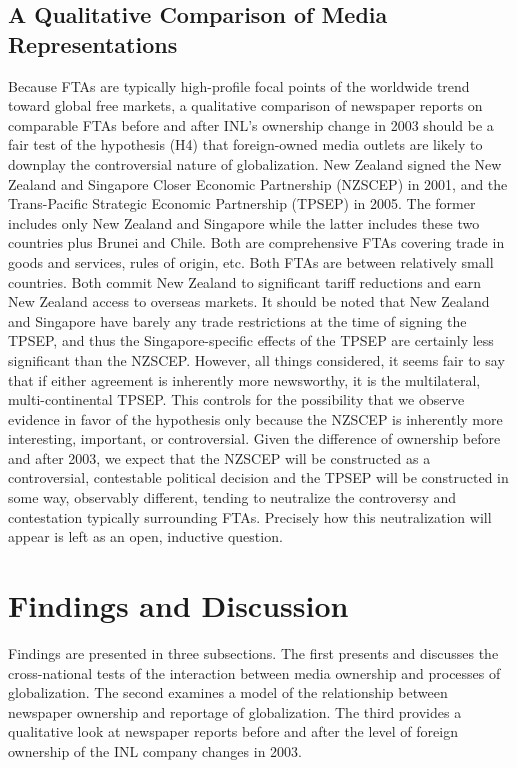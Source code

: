 \documentclass[12pt]{report}
\begin{document}
\subsection{A Qualitative Comparison of Media Representations}
Because FTAs are typically high-profile focal points of the worldwide trend toward global free markets, a qualitative comparison of newspaper reports on comparable FTAs before and after INL's ownership change in 2003 should be a
fair test of the hypothesis (H4) that foreign-owned media outlets are likely to downplay the
controversial nature of globalization. New Zealand signed the New Zealand and Singapore Closer
Economic Partnership (NZSCEP) in 2001, and the Trans-Pacific Strategic Economic Partnership (TPSEP)
in 2005. The former includes only New Zealand and Singapore while the latter includes these two
countries plus Brunei and Chile. Both are comprehensive FTAs covering trade in goods and services,
rules of origin, etc. Both FTAs are between relatively small countries. Both commit New Zealand to
significant tariff reductions and earn New Zealand access to overseas markets. It should be noted
that New Zealand and Singapore have barely any trade restrictions at the time of signing the TPSEP,
and thus the Singapore-specific effects of the TPSEP are certainly less significant than the NZSCEP.
However, all things considered, it seems fair to say that if either agreement is inherently more
newsworthy, it is the multilateral, multi-continental TPSEP. This controls for the possibility that
we observe evidence in favor of the hypothesis only because the NZSCEP is inherently more
interesting, important, or controversial. Given the difference of ownership before and after 2003,
we expect that the NZSCEP will be constructed as a controversial, contestable political decision and
the TPSEP will be constructed in some way, observably different, tending to neutralize the
controversy and contestation typically surrounding FTAs. Precisely how this neutralization will
appear is left as an open, inductive question.


\section{Findings and Discussion}
Findings are presented in three subsections. The first presents and discusses the cross-national tests of the interaction between media ownership and processes of globalization. The second examines a model of the relationship between newspaper ownership and reportage of globalization. The third provides a qualitative look at newspaper reports before and after the level of foreign ownership of the INL company changes in 2003.
\end{document}
